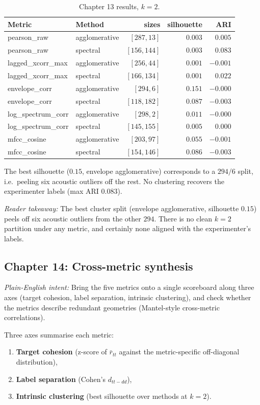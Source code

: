 \documentclass[11pt]{article}
\newcommand{\pintent}[1]{\par\medskip\noindent\textit{Plain-English intent:} #1\par\smallskip}
\newcommand{\pkey}[1]{\par\medskip\noindent\textit{Reader takeaway:} #1\par\smallskip}
\begin{document}
\begin{table}[H]
\centering
\caption{Chapter 13 results, $k=2$.}
\begin{tabular}{llrrr}
\toprule
Metric & Method & sizes & silhouette & ARI \\
\midrule
pearson\_raw       & agglomerative & $[287, 13]$ & $0.003$ & $0.005$ \\
pearson\_raw       & spectral      & $[156, 144]$ & $0.003$ & $0.083$ \\
lagged\_xcorr\_max & agglomerative & $[256, 44]$  & $0.001$ & $-0.001$ \\
lagged\_xcorr\_max & spectral      & $[166, 134]$ & $0.001$ & $0.022$ \\
envelope\_corr     & agglomerative & $[294, 6]$   & $\mathbf{0.151}$ & $-0.000$ \\
envelope\_corr     & spectral      & $[118, 182]$ & $0.087$ & $-0.003$ \\
log\_spectrum\_corr& agglomerative & $[298, 2]$   & $0.011$ & $-0.000$ \\
log\_spectrum\_corr& spectral      & $[145, 155]$ & $0.005$ & $0.000$ \\
mfcc\_cosine       & agglomerative & $[203, 97]$  & $0.055$ & $-0.001$ \\
mfcc\_cosine       & spectral      & $[154, 146]$ & $0.086$ & $-0.003$ \\
\bottomrule
\end{tabular}
\end{table}

The best silhouette ($0.15$, envelope agglomerative) corresponds to a
$294/6$ split, i.e.\ peeling six acoustic outliers off the rest.  No
clustering recovers the experimenter labels (max ARI $0.083$).
\pkey{The best cluster split (envelope agglomerative, silhouette $0.15$)
peels off six acoustic outliers from the other $294$. There is no clean
$k=2$ partition under any metric, and certainly none aligned with the
experimenter's labels.}

\subsection{Chapter 14: Cross-metric synthesis}
\pintent{Bring the five metrics onto a single scoreboard along three axes
(target cohesion, label separation, intrinsic clustering), and check whether
the metrics describe redundant geometries (Mantel-style cross-metric
correlations).}

Three axes summarise each metric:
\begin{enumerate}[leftmargin=*]
\item \textbf{Target cohesion} (z-score of $\bar r_{tt}$ against the
metric-specific off-diagonal distribution),
\item \textbf{Label separation} (Cohen's $d_{tt - dd}$),
\item \textbf{Intrinsic clustering} (best silhouette over methods at $k=2$).
\end{enumerate}
\end{document}
